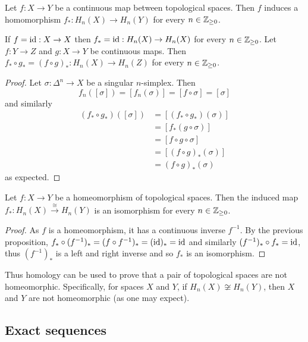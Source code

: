 \begin{corollary}
	Let $f: X \to Y$ be a continuous map between topological spaces. Then $f$ induces a homomorphism $f_*: H_n(X) \to H_n(Y)$ for every $n \in \mathbb{Z}_{\geq 0}$.
\end{corollary}

\begin{proposition}
	If $f = \operatorname{id}: X \to X$ then $f_* = \operatorname{id}: H_n(X) \to H_n(X)$ for every $n \in \mathbb{Z}_{\geq 0}$. Let $f: Y \to Z$ and $g: X \to Y$ be continuous maps. Then $f_* \circ g_* = (f \circ g)_*: H_n(X) \to H_n(Z)$ for every $n \in \mathbb{Z}_{\geq 0}$.
\end{proposition}

\begin{proof}
	Let $\sigma: \Delta^n \to X$ be a singular $n$-simplex. Then
	\[f_n([\sigma])=[f_n(\sigma)]=[f\circ\sigma]=[\sigma]\]
	and similarly
	\begin{align*}
		(f_* \circ g_*)([\sigma])
		 & = [(f_* \circ g_*)(\sigma)] \\
		 & = [f_*(g\circ\sigma)]       \\
		 & = [f\circ g \circ\sigma]    \\
		 & = [(f\circ g)_*(\sigma)]    \\
		 & = (f\circ g)_*(\sigma)
	\end{align*}
	as expected.
\end{proof}

\begin{proposition}
	Let $f: X \to Y$ be a homeomorphism of topological spaces. Then the induced map $f_*: H_n(X) \xrightarrow{\cong} H_n(Y)$ is an isomorphism for every $n \in \mathbb{Z}_{\geq 0}$.
\end{proposition}

\begin{proof}
	As $f$ is a homeomorphism, it has a continuous inverse $f^{-1}$. By the previous proposition, $f_* \circ (f^{-1})_* = (f \circ f^{-1})_* = (\operatorname{id})_* = \operatorname{id}$ and similarly $(f^{-1})_* \circ f_* = \operatorname{id}$, thus $(f^{-1})_*$ is a left and right inverse and so $f_*$ is an isomorphism.
\end{proof}

Thus homology can be used to prove that a pair of topological spaces are not homeomorphic. Specifically, for spaces $X$ and $Y$, if $H_n(X) \not\cong H_n(Y)$, then $X$ and $Y$ are not homeomorphic (as one may expect).

\subsection{Exact sequences}

